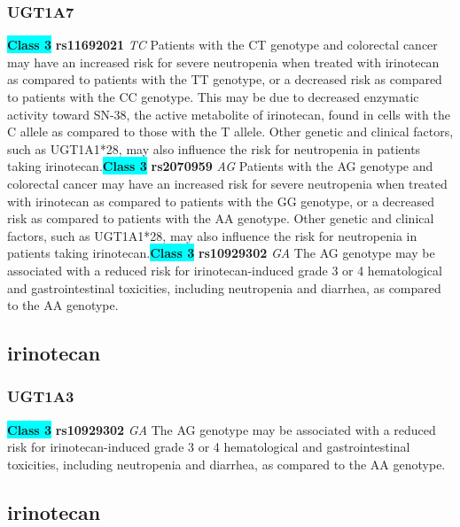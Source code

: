 \documentclass{book}
\begin{document}
\subsubsection{ UGT1A7 }

\begin{center}
\textbf{\colorbox{cyan} {Class 3}} \textbf{ rs11692021 } \textit{ TC }
Patients with the CT genotype and colorectal cancer may have an increased risk for severe neutropenia when treated with irinotecan as compared to patients with the TT genotype, or a decreased risk as compared to patients with the CC genotype. This may be due to decreased enzymatic activity toward SN-38, the active metabolite of irinotecan, found in cells with the C allele as compared to those with the T allele. Other genetic and clinical factors, such as UGT1A1*28, may also influence the risk for neutropenia in patients taking irinotecan.\textbf{\colorbox{cyan} {Class 3}} \textbf{ rs2070959 } \textit{ AG }
Patients with the AG genotype and colorectal cancer may have an increased risk for severe neutropenia when treated with irinotecan as compared to patients with the GG genotype, or a decreased risk as compared to patients with the AA genotype. Other genetic and clinical factors, such as UGT1A1*28, may also influence the risk for neutropenia in patients taking irinotecan.\textbf{\colorbox{cyan} {Class 3}} \textbf{ rs10929302 } \textit{ GA }
The AG genotype may be associated with a reduced risk for irinotecan-induced grade 3 or 4 hematological and gastrointestinal toxicities, including neutropenia and diarrhea, as compared to the AA genotype. 


\end{center}\subsection{ irinotecan }


\subsubsection{ UGT1A3 }

\begin{center}
\textbf{\colorbox{cyan} {Class 3}} \textbf{ rs10929302 } \textit{ GA }
The AG genotype may be associated with a reduced risk for irinotecan-induced grade 3 or 4 hematological and gastrointestinal toxicities, including neutropenia and diarrhea, as compared to the AA genotype. 


\end{center}\subsection{ irinotecan }
\end{document}
